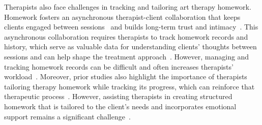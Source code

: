 Therapists also face challenges in tracking and tailoring art therapy homework. Homework fosters an asynchronous therapist-client collaboration that keeps clients engaged between sessions~\cite{huckvale2009case,hoshino2011narrative} and builds long-term trust and intimacy~\cite{huckvale2009case}.
This asynchronous collaboration requires therapists to track homework records and history, which serve as valuable data for understanding clients' thoughts between sessions and can help shape the treatment approach~\cite{kazantzis2007handbook,hoshino2011narrative,richards2018impact}.
However, managing and tracking homework records can be difficult and often increases therapists' workload~\cite{richards2018impact}.
Moreover, prior studies also highlight the importance of therapists tailoring therapy homework while tracking its progress, which can reinforce that therapeutic process~\cite{Oewel_2024, kazantzis2007handbook}. 
However, assisting therapists in creating structured homework that is tailored to the client's needs and incorporates emotional support remains a significant challenge~\cite{kazantzis2007handbook, coon2002encouraging, Oewel_2024}.



